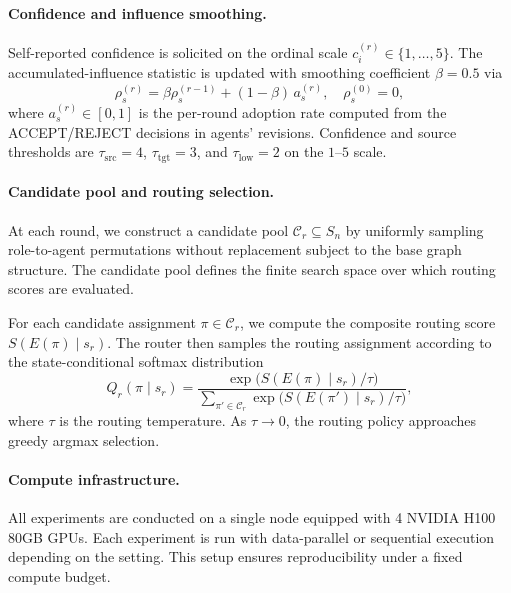 \paragraph{Confidence and influence smoothing.}
Self-reported confidence is solicited on the ordinal scale $c_i^{(r)}\in\{1,\ldots,5\}$. The accumulated-influence statistic is updated with smoothing coefficient $\beta=0.5$ via
\begin{equation*}
    \rho_s^{(r)}=\beta\rho_s^{(r-1)}+(1-\beta)\,a_s^{(r)},\quad \rho_s^{(0)}=0,
\end{equation*}
where $a_s^{(r)}\in[0,1]$ is the per-round adoption rate computed from the ACCEPT/REJECT decisions in agents' revisions. Confidence and source thresholds are $\tau_{\mathrm{src}}=4$, $\tau_{\mathrm{tgt}}=3$, and $\tau_{\mathrm{low}}=2$ on the $1$--$5$ scale.
 
\paragraph{Candidate pool and routing selection.}
At each round, we construct a candidate pool
$\mathcal{C}_r\subseteq S_n$
by uniformly sampling role-to-agent permutations without replacement subject to the base graph structure.
The candidate pool defines the finite search space over which routing scores are evaluated.

For each candidate assignment $\pi\in\mathcal{C}_r$, we compute the composite routing score
$S(E(\pi)\mid s_r)$.
The router then samples the routing assignment according to the state-conditional softmax distribution
\begin{equation*}
Q_r(\pi\mid s_r)
=
\frac{
\exp\!\big(S(E(\pi)\mid s_r)/\tau\big)
}{
\sum_{\pi'\in\mathcal{C}_r}
\exp\!\big(S(E(\pi')\mid s_r)/\tau\big)
},
\end{equation*}
where $\tau$ is the routing temperature.
As $\tau\to 0$, the routing policy approaches greedy argmax selection.

 
\paragraph{Compute infrastructure.}
All experiments are conducted on a single node equipped with 4 NVIDIA H100 80GB GPUs. Each experiment is run with data-parallel or sequential execution depending on the setting. This setup ensures reproducibility under a fixed compute budget.







